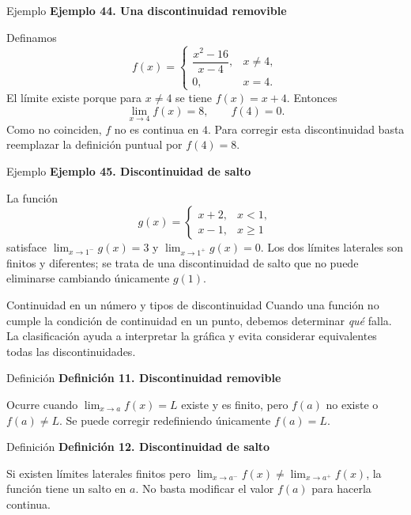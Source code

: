 \documentclass[12pt,aspectratio=169]{beamer}
\begin{document}
\begin{frame}[t,allowframebreaks]{Ejemplo}
{\color{azul}\bfseries Ejemplo 44. Una discontinuidad removible}\par\medskip

Definamos
\[
 f(x)=\begin{cases}\dfrac{x^2-16}{x-4},&x\ne4,\\0,&x=4.\end{cases}
\]
El límite existe porque para $x\ne4$ se tiene $f(x)=x+4$. Entonces
\[
 \lim_{x\to4}f(x)=8,\qquad f(4)=0.
\]
Como no coinciden, $f$ no es continua en $4$. Para corregir esta discontinuidad basta reemplazar la definición puntual por $f(4)=8$.
\end{frame}


\begin{frame}[t,allowframebreaks]{Ejemplo}
{\color{azul}\bfseries Ejemplo 45. Discontinuidad de salto}\par\medskip

La función
\[
 g(x)=\begin{cases}x+2,&x<1,\\x-1,&x\ge1\end{cases}
\]
satisface $\lim_{x\to1^-}g(x)=3$ y $\lim_{x\to1^+}g(x)=0$. Los dos límites laterales son finitos y diferentes; se trata de una discontinuidad de salto que no puede eliminarse cambiando únicamente $g(1)$.
\end{frame}


\begin{frame}[t,allowframebreaks]{Continuidad en un número y tipos de discontinuidad}
Cuando una función no cumple la condición de continuidad en un punto, debemos determinar \emph{qué} falla. La clasificación ayuda a interpretar la gráfica y evita considerar equivalentes todas las discontinuidades.
\end{frame}


\begin{frame}[t,allowframebreaks]{Definición}
{\color{azul}\bfseries Definición 11. Discontinuidad removible}\par\medskip

Ocurre cuando $\lim_{x\to a}f(x)=L$ existe y es finito, pero $f(a)$ no existe o $f(a)\ne L$. Se puede corregir redefiniendo únicamente $f(a)=L$.
\end{frame}


\begin{frame}[t,allowframebreaks]{Definición}
{\color{azul}\bfseries Definición 12. Discontinuidad de salto}\par\medskip

Si existen límites laterales finitos pero $\lim_{x\to a^-}f(x)\ne\lim_{x\to a^+}f(x)$, la función tiene un salto en $a$. No basta modificar el valor $f(a)$ para hacerla continua.
\end{frame}
\end{document}
